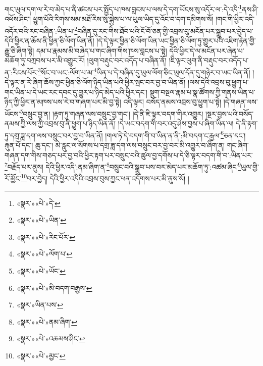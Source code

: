 གང་ཡུལ་དག་ལ་རེ་བ་མེད་པ་ནི་ཚངས་པར་སྤྱོད་པ་ཁས་བླངས་པ་ལས་དེ་དག་ཡོངས་སུ་འདོར་ལ་:དེ་འདི་\footnote{«སྣར་»«པེ་»དེ་}ནས་ཤི་འཕོས་ཤིང་། ཕྱུག་པོའི་རིགས་སམ་མཐོ་རིས་སུ་སྐྱེས་པ་ལ་ཡུལ་ཡིད་དུ་འོང་བ་དག་དམིགས་སོ། །གང་གི་ཕྱིར་འདི་འདོར་བའི་རང་བཞིན་:ཡིན་པ་\footnote{«སྣར་»«པེ་»ཡིན་}བཞིན་དུ་རང་གིས་ཐོབ་པའི་ངོ་བོ་ཅན་གྱི་འབྲས་བུ་མངོན་པར་སྒྲུབ་པར་བྱེད་པ་དེའི་ཕྱིར་ན་ཆོས་ནི་ཕྱིན་ཅི་ལོག་ཡིན་ནོ། །དེ་དེ་ལྟར་ཕྱིན་ཅི་ལོག་ཡིན་ཡང་ཕྱིན་ཅི་ལོག་ཏུ་གྱུར་པའི་འཇིག་རྟེན་གྱི་རྒྱུ་ཅི་ཞིག་སྟེ། དམ་པ་རྣམས་མི་བཞེད་པ་གང་ཞིག་གིས་ཁས་བླངས་པ་སྟེ། དེའི་ཕྱིར་དེ་ལ་མངོན་པར་ཞེན་པ་མཆོག་ཏུ་བཀྲབས་པར་མི་འགྱུར་རོ། །ལུག་བརྡུང་བར་འདོད་པ་བཞིན་ནོ། །ཇི་ལྟར་ལུག་ནི་བརྡུང་བར་འདོད་པ་ན་:རིངས་པོར་\footnote{«སྣར་»«པེ་»རིང་པོར་}སོང་བ་ཡང་:ལོག་པ་མ་\footnote{«སྣར་»«པེ་»ལོག་པ་}ཡིན་པ་དེ་བཞིན་དུ་ཡུལ་ལོག་ཅིང་ཡུལ་དོན་དུ་གཉེར་བ་ཡང་ཡིན་ནོ། །དེ་ལྟར་ན་རེ་ཞིག་ཆོས་ཀྱང་ཕྱིན་ཅི་ལོག་ཉིད་ཡིན་པའི་ཕྱིར་སྤང་བར་བྱ་བ་ཡིན་ནོ། །ལས་དེའི་འབྲས་བུ་ཕྱུག་པ་གང་ཡིན་པ་དེ་ཡང་རང་དབང་དུ་གྱུར་པ་ཉིད་མེད་པའི་ཕྱིར་དང་། སྡུག་བསྔལ་རྣམ་པ་སྣ་ཚོགས་ཀྱི་གནས་ཡིན་པ་ཉིད་ཀྱི་ཕྱིར་ན་མཁས་པས་རེ་བ་གཞག་པར་མི་བྱ་སྟེ། འདི་ལྟར། བསོད་ནམས་འབྲས་བུ་ཕྱུག་པ་སྟེ། །དེ་གཞན་ལས་ཡོངས་\footnote{«སྣར་»«པེ་»ཡོང་}བསྲུང་བྱ་ན། །རྟག་ཏུ་གཞན་ལས་བསྲུང་བྱ་གང་། །དེ་ནི་ཇི་ལྟར་བདག་གིར་འགྱུར། །སྔར་བྱས་པའི་བསོད་ནམས་ཀྱི་ལས་ཀྱི་འབྲས་བུ་ནི་ཕྱུག་པ་ཉིད་ཡིན་ནོ། །དེ་ཡང་བདག་གི་བར་འདུ་ཤེས་བྱས་པ་ཞིག་ཡིན་ལ། དེ་ནི་རྟག་ཏུ་དགྲ་ཟླ་དག་ལས་བསྲུང་བར་བྱ་བ་ཡིན་ནོ། །གལ་ཏེ་དེ་བདག་གི་བ་ཡིན་ན་ནི་:མི་བདག་ང་རྒྱལ་\footnote{«སྣར་»«པེ་»མི་བདག་བརྒྱས་}ཅན་དང་། རྐུན་པོ་དང་། ཆུ་དང་། མེ་རླུང་ལ་སོགས་པ་དགྲ་ཟླ་དག་ལས་བསྲུང་བར་བྱ་བར་མི་འགྱུར་བ་ཞིག་ན། གང་ཞིག་གཞན་དག་གིས་གཅད་པར་བྱ་བའི་ཕྱིར་རྟག་པར་བསྲུང་བའི་ཚུལ་བྱ་དགོས་པ་དེ་ཅི་ལྟར་བདག་གི་བ་:ཡིན་པར་\footnote{«སྣར་»ཡིན་པས་}བརྗོད་པར་ནུས། དེའི་ཕྱིར་འདི་:ནམ་ཞིག་ན་\footnote{«སྣར་»«པེ་»ནམ་ཞིག་}བསྲུང་བའི་སྒྲུབ་པས་བར་མེད་པར་མཆོག་ཏུ་:འཚམ་ཞིང་\footnote{«སྣར་»«པེ་»འཆམས་ཤིང་}ཡུལ་གྱི་རོ་མྱོང་\footnote{«སྣར་»«པེ་»མྱང་}བར་བྱེད། དེའི་ཕྱིར་འདིའི་འབྲས་བུས་ཀྱང་ཕན་འདོགས་པར་མི་ནུས་སོ། །
